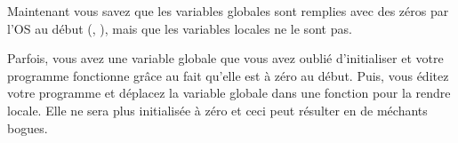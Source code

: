 
Maintenant vous savez que les variables globales sont remplies avec des zéros
par l'\ac{OS} au début
(, ),
mais que les variables locales ne le sont pas.

Parfois, vous avez une variable globale que vous avez oublié d'initialiser et votre
programme fonctionne grâce au fait qu'elle est à zéro au début.
Puis, vous éditez votre programme et déplacez la variable globale dans une fonction
pour la rendre locale.
Elle ne sera plus initialisée à zéro et ceci peut résulter en de méchants bogues.

